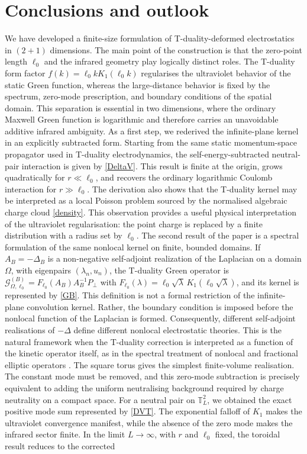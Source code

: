 \documentclass[nopacs,amsmath,amsfonts,amssymb,aps,superscriptaddress]{revtex4}
\begin{document}
\section{Conclusions and outlook}
\label{sec:conclusions}

We have developed a finite-size formulation of T-duality-deformed electrostatics in $(2+1)$ dimensions. The main point of the construction is that the zero-point length $\ell_0$ and the infrared geometry play logically distinct roles. The T-duality form factor $f(k)=\ell_0 kK_1(\ell_0 k)$ regularises the ultraviolet behavior of the static Green function, whereas the large-distance behavior is fixed by the spectrum, zero-mode prescription, and boundary conditions of the spatial domain. This separation is essential in two dimensions, where the ordinary Maxwell Green function is logarithmic and therefore carries an unavoidable additive infrared ambiguity. As a first step, we rederived the infinite-plane kernel in an explicitly subtracted form. Starting from the same static momentum-space propagator used in T-duality electrodynamics, the self-energy-subtracted neutral-pair interaction is given by \eqref{DeltaV}. This result is finite at the origin, grows quadratically for $r\ll\ell_0$, and recovers the ordinary logarithmic Coulomb interaction for $r\gg\ell_0$. The derivation also shows that the T-duality kernel may be interpreted as a local Poisson problem sourced by the normalised algebraic charge cloud \eqref{density}. This observation provides a useful physical interpretation of the ultraviolet regularisation: the point charge is replaced by a finite distribution with a radius set by $\ell_0$. The second result of the paper is a spectral formulation of the same nonlocal kernel on finite, bounded domains. If $A_B=-\Delta_B$ is a non-negative self-adjoint realization of the Laplacian on a domain $\Omega$, with eigenpairs $(\lambda_n,u_n)$, the T-duality Green operator is $\mathcal G_{\Omega,\ell_0}^{(B)}=F_{\ell_0}(A_B)A_B^{-1}P_\perp$ with $F_{\ell_0}(\lambda)=\ell_0\sqrt{\lambda}\, K_1(\ell_0\sqrt{\lambda})$, and its kernel is represented by \eqref{GB}. This definition is not a formal restriction of the infinite-plane convolution kernel. Rather, the boundary condition is imposed before the nonlocal function of the Laplacian is formed. Consequently, different self-adjoint realisations of $-\Delta$ define different nonlocal electrostatic theories. This is the natural framework when the T-duality correction is interpreted as a function of the kinetic operator itself, as in the spectral treatment of nonlocal and fractional elliptic operators \cite{Seeley1967, Grubb2015, Kwasnicki2017, BonitoPasciak2015}. The square torus gives the simplest finite-volume realisation. The constant mode must be removed, and this zero-mode subtraction is precisely equivalent to adding the uniform neutralising background required by charge neutrality on a compact space. For a neutral pair on $\mathbb T_L^2$, we obtained the exact positive mode sum represented by \eqref{DVT}. The exponential falloff of $K_1$ makes the ultraviolet convergence manifest, while the absence of the zero mode makes the infrared sector finite. In the limit $L\to\infty$, with $r$ and $\ell_0$ fixed, the toroidal result reduces to the corrected 
\end{document}
